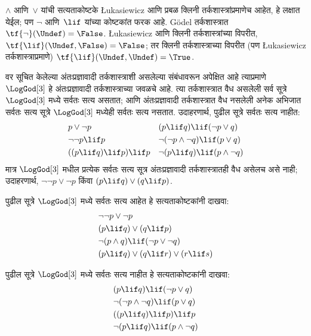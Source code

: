 \documentclass[../../../include/open-logic-section]{subfiles}
\begin{document}
$\land$ आणि~$\lor$ यांची सत्यताकोष्टके \L ukasiewicz
आणि प्रबळ क्लिनी तर्कशास्त्रांप्रमाणेच आहेत, हे लक्षात येईल;
पण $\lnot$ आणि~$\lif$ यांच्या कोष्टकांत फरक आहे.
G\"odel तर्कशास्त्रात $\tf{\lnot}(\Undef) = \False$.
\L ukasiewicz आणि क्लिनी तर्कशास्त्रांच्या विपरीत,
$\tf{\lif}(\Undef, \False) = \False$; तर क्लिनी
तर्कशास्त्राच्या विपरीत (पण \L ukasiewicz तर्कशास्त्राप्रमाणे)
$\tf{\lif}(\Undef, \Undef) = \True$.

वर सूचित केलेल्या अंतःप्रज्ञावादी तर्कशास्त्राशी असलेल्या
संबंधावरून अपेक्षित आहे त्याप्रमाणे $\LogGod[3]$ हे
अंतःप्रज्ञावादी तर्कशास्त्राच्या जवळचे आहे. त्या तर्कशास्त्रात
वैध असलेली सर्व सूत्रे $\LogGod[3]$ मध्ये सर्वतः सत्य
असतात; आणि अंतःप्रज्ञावादी तर्कशास्त्रात वैध नसलेली अनेक
अभिजात सर्वतः सत्य सूत्रे $\LogGod[3]$ मध्येही सर्वतः
सत्य नसतात. उदाहरणार्थ, पुढील सूत्रे सर्वतः सत्य नाहीत:
\begin{align*}
  & p \lor \lnot p && (p \lif q) \lif (\lnot p \lor q) \\
  & \lnot\lnot p \lif p && \lnot(\lnot p \land \lnot q) \lif (p \lor q) \\
  & ((p \lif q) \lif p) \lif p && \lnot(p \lif q) \lif (p \land \lnot q)
\end{align*}
मात्र $\LogGod[3]$ मधील प्रत्येक सर्वतः सत्य सूत्र
अंतःप्रज्ञावादी तर्कशास्त्रातही वैध असेलच असे नाही;
उदाहरणार्थ, $\lnot\lnot p \lor \lnot p$ किंवा $(p
\lif q) \lor (q \lif p)$.

\begin{prob}
  पुढील सूत्रे $\LogGod[3]$ मध्ये सर्वतः सत्य आहेत हे
  सत्यताकोष्टकांनी दाखवा:
  \begin{align*}
    & \lnot\lnot p \lor \lnot p\\
    & (p \lif q) \lor (q \lif p) \\
    & \lnot(p \land q) \lif (\lnot p \lor \lnot q) \\
    & (p \lif q) \lor (q \lif r) \lor (r \lif s)
  \end{align*}
\end{prob}

\begin{prob}
  पुढील सूत्रे $\LogGod[3]$ मध्ये सर्वतः सत्य नाहीत हे
  सत्यताकोष्टकांनी दाखवा:
  \begin{align*}
    & (p \lif q) \lif (\lnot p \lor q) \\
    & \lnot(\lnot p \land \lnot q) \lif (p \lor q) \\
    & ((p \lif q) \lif p) \lif p \\
    & \lnot(p \lif q) \lif (p \land \lnot q)
  \end{align*}
\end{prob}
\end{document}
